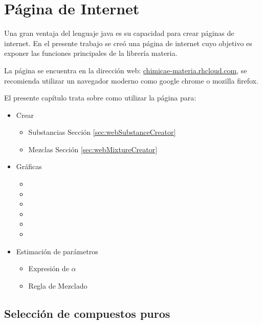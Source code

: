 \chapter{Página de Internet}\label{chap:webPage}

	Una gran ventaja del lenguaje java es su capacidad para crear páginas de internet. En el presente trabajo se creó una página de internet cuyo objetivo es exponer las funciones principales de la librería materia.

	La página se encuentra en la dirección web: \url{chimicae-materia.rhcloud.com}, se recomienda utilizar un navegador moderno como google chrome o mozilla firefox.

	El presente capítulo trata sobre como utilizar la página para:

	\begin{itemize}
		\item{Crear}
			\begin{itemize}
				\item{Substancias} Sección \ref{sec:webSubstanceCreator}
				\item{Mezclas} Sección \ref{sec:webMixtureCreator}
			\end{itemize}
		\item{Gráficas}
			\begin{itemize}
				\item {}
				\item {}
				\item {}
				\item {}
				\item {}
				\item {}
			\end{itemize}
		\item{Estimación de parámetros}
			\begin{itemize}
				\item Expresión de $\alpha$
				\item Regla de Mezclado
			\end{itemize}
	\end{itemize}

\section{Selección de compuestos puros}\label{sec:webCompounds}


